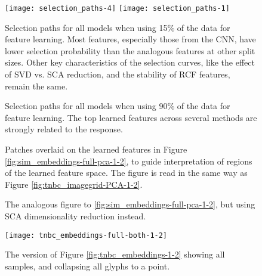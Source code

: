 \begin{figure}
  \centering
  \texttt{[image: selection\_paths-4]}
  \texttt{[image: selection\_paths-1]}
  \caption{Selection paths for all models when using 15\% of the data for
    feature learning. Most features, especially those from the CNN, have lower
    selection probability than the analogous features at other split sizes.
    Other key characteristics of the selection curves, like the effect of SVD
    vs. SCA reduction, and the stability of RCF features, remain the same.}
  \label{fig:selection_paths15}
\end{figure}

\begin{figure}
  \centering
  \caption{Selection paths for all models when using 90\% of the data for
    feature learning. The top learned features across several methods are
    strongly related to the response.}
  \label{fig:selection_paths90}
\end{figure}

\begin{figure}
  \centering
  \caption{Patches overlaid on the learned features in Figure
    \ref{fig:sim_embeddings-full-pca-1-2}, to guide interpretation of regions of
    the learned feature space. The figure is read in the same way as Figure
    \ref{fig:tnbc_imagegrid-PCA-1-2}.}
  \label{fig:sim_imagegrid-PCA-15-1-2}
\end{figure}

\begin{figure}
  \centering
  \caption{The analogous figure to \ref{fig:sim_embeddings-full-pca-1-2}, but
    using SCA dimensionality reduction instead.}
  \label{fig:sim_imagegrid-SCA-15-1-2}
\end{figure}

\begin{figure}
\centering
  \texttt{[image: tnbc\_embeddings-full-both-1-2]}
  \caption{The version of Figure \ref{fig:tnbc_embeddings-1-2} showing all
    samples, and collapsing all glyphs to a point.}
  \label{fig:tnbc_embeddings-full-both-1-2}
\end{figure}


